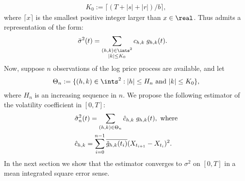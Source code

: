 \begin{align}
  K_0:= \lceil (T + |s| + |r|)/b \rceil,
\end{align}
where $\lceil x\rceil$ is the smallest positive integer larger than $x \in \real$.  Thus \bsv admits a  representation of the form: 
\begin{align}
  &\bsv(t) =  \sum_{\substack{(h,k) \in \ints^2\\\vert k \vert \le K_0}} \chk\;g_{h,k}(t).
\end{align}
Now, suppose $n$ observations of the log price process are available, and let 
\begin{align}
  \Theta_n := \{(h,k) \in \ints^2 : |h| \le H_n \text{ and }|k| \le K_0\},\notag
  \label{}
\end{align}
where $H_n$ is an increasing sequence in $n$. 
We propose the following estimator of the volatility coefficient in $[0,T]$:
\begin{align}
  &\hat{\sigma}_{n}^2(t) = \sum_{(h,k) \in \Theta_n} \hat{c}_{h,k}\;g_{h,k}(t), \text{ where}\\
  &\hat{c}_{h,k} = \sum_{i =0}^{n-1} \overline{\tilde{g}_{h,k}(t_i)} (X_{t_{i+1}} - X_{t_i})^2.
  \label{}
\end{align}
In the next section we show that the estimator converges to $\sigma^2$ on $[0,T]$ in a mean integrated square error sense.
